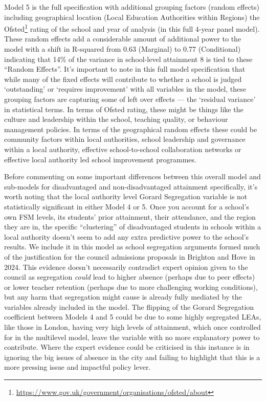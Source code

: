 \documentclass[
  11pt,
]{article}
\begin{document}
Model 5 is the full specification with additional grouping factors
(random effects) including geographical location (Local Education
Authorities within Regions) the Ofsted\footnote{\url{https://www.gov.uk/government/organisations/ofsted/about}}
rating of the school and year of analysis (in this full 4-year panel
model). These random effects add a considerable amount of additional
power to the model with a shift in R-squared from 0.63 (Marginal) to
0.77 (Conditional) indicating that 14\% of the variance in school-level
attainment 8 is tied to these ``Random Effects''. It's important to note
in this full model specification that while many of the fixed effects
will contribute to whether a school is judged `outstanding' or `requires
improvement' with all variables in the model, these grouping factors are
capturing some of left over effects --- the `residual variance' in
statistical terms. In terms of Ofsted rating, these might be things like
the culture and leadership within the school, teaching quality, or
behaviour management policies. In terms of the geographical random
effects these could be community factors within local authorities,
school leadership and governance within a local authority, effective
school-to-school collaboration networks or effective local authority led
school improvement programmes.

Before commenting on some important differences between this overall
model and sub-models for disadvantaged and non-disadvantaged attainment
specifically, it's worth noting that the local authority level Gorard
Segregation variable is not statistically significant in either Model 4
or 5. Once you account for a school's own FSM levels, its students'
prior attainment, their attendance, and the region they are in, the
specific ``clustering'' of disadvantaged students in schools within a
local authority doesn't seem to add any extra predictive power to the
school's results. We include it in this model as school segregation
arguments formed much of the justification for the council admissions
proposals in Brighton and Hove in 2024. This evidence doesn't
necessarily contradict expert opinion given to the council as
segregation \emph{could} lead to higher absence (perhaps due to peer
effects) or lower teacher retention (perhaps due to more challenging
working conditions), but any harm that segregation might cause is
already fully mediated by the variables already included in the model.
The flipping of the Gorard Segregation coefficient between Models 4 and
5 could be due to some highly segregated LEAs, like those in London,
having very high levels of attainment, which once controlled for in the
multilevel model, leave the variable with no more explanatory power to
contribute. Where the expert evidence could be criticised in this
instance is in ignoring the big issues of absence in the city and
failing to highlight that this is a more pressing issue and impactful
policy lever.
\end{document}
